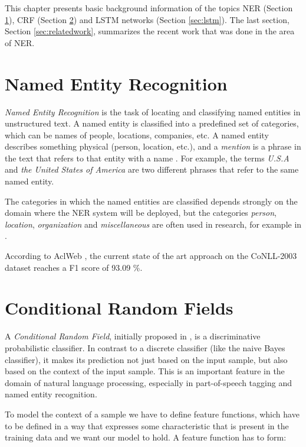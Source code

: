 \documentclass[12pt]{book}
\begin{document}
	This chapter presents basic background information of the topics NER (Section \ref{sec:ner}), CRF (Section \ref{sec:crf}) and LSTM networks (Section \ref{sec:lstm}). The last section, Section \ref{sec:relatedwork}, summarizes the recent work that was done in the area of NER. 

	
	\section{Named Entity Recognition}
	\label{sec:ner}
	
	\textit{Named Entity Recognition} is the task of locating and classifying named entities in unstructured text. A named entity is classified into a predefined set of categories, which can be names of people, locations, companies, etc. A named entity describes something physical (person, location, etc.), and a \textit{mention} is a phrase in the text that refers to that entity with a name \cite{MAL-013}. For example, the terms \textit{U.S.A} and \textit{the United States of America} are two different phrases that refer to the same named entity.
	
	The categories in which the named entities are classified depends strongly on the domain where the NER system will be deployed, but the categories \textit{person}, \textit{location}, \textit{organization} and \textit{miscellaneous} are often used in research, for example in \cite{tjongkimsang2003conll}.
	 
	According to AclWeb \cite{conll-sota}, the current state of the art approach on the CoNLL-2003 \cite{tjongkimsang2003conll} dataset reaches a F1 score of 93.09 \%.
	
	\section{Conditional Random Fields}
	\label{sec:crf}
	
	A \textit{Conditional Random Field}, initially proposed in \cite{lafferty2001conditional}, is a discriminative probabilistic classifier. In contrast to a discrete classifier (like the naive Bayes classifier), it makes its prediction not just based on the input sample, but also based on the context of the input sample. This is an important feature in the domain of natural language processing, especially in part-of-speech tagging and named entity recognition. 
	
	To model the context of a sample we have to define feature functions, which have to be defined in a way that expresses some characteristic that is present in the training data and we want our model to hold. A feature function has to form:
	
\end{document}
